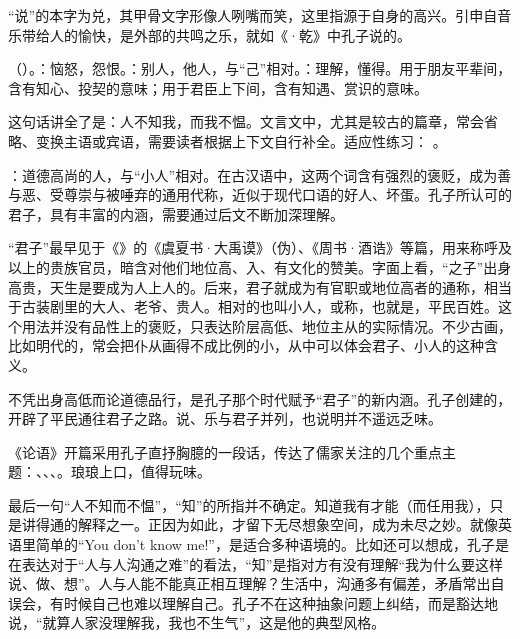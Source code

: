 {“说”的本字为兑，其甲骨文字形像人咧嘴而笑，这里指源于自身的高兴。引申自音乐带给人的愉快，是外部的共鸣之乐，就如《·乾》中孔子说的。

\item {}（）。：恼怒，怨恨。：别人，他人，与“己”相对。：理解，懂得。用于朋友平辈间，含有知心、投契的意味；用于君臣上下间，含有知遇、赏识的意味。

这句话讲全了是：人不知我，而我不愠。文言文中，尤其是较古的篇章，常会省略、变换主语或宾语，需要读者根据上下文自行补全。适应性练习：   。

\item {}：道德高尚的人，与“小人”相对。在古汉语中，这两个词含有强烈的褒贬，成为善与恶、受尊崇与被唾弃的通用代称，近似于现代口语的好人、坏蛋。孔子所认可的君子，具有丰富的内涵，需要通过后文不断加深理解。

“君子”最早见于《》的《虞夏书·大禹谟》（伪）、《周书·酒诰》等篇，用来称呼及以上的贵族官员，暗含对他们地位高、入、有文化的赞美。字面上看，“之子”出身高贵，天生是要成为人上人的。后来，君子就成为有官职或地位高者的通称，相当于古装剧里的大人、老爷、贵人。相对的也叫小人，或称，也就是，平民百姓。这个用法并没有品性上的褒贬，只表达阶层高低、地位主从的实际情况。不少古画，比如明代的，常会把仆从画得不成比例的小，从中可以体会君子、小人的这种含义。

不凭出身高低而论道德品行，是孔子那个时代赋予“君子”的新内涵。孔子创建的，开辟了平民通往君子之路。说、乐与君子并列，也说明并不遥远乏味。
}
{
《论语》开篇采用孔子直抒胸臆的一段话，传达了儒家关注的几个重点主题：、、、。琅琅上口，值得玩味。

最后一句“人不知而不愠”，“知”的所指并不确定。知道我有才能（而任用我），只是讲得通的解释之一。正因为如此，才留下无尽想象空间，成为未尽之妙。就像英语里简单的“You don't know me!”，是适合多种语境的。比如还可以想成，孔子是在表达对于“人与人沟通之难”的看法，“知”是指对方有没有理解“我为什么要这样说、做、想”。人与人能不能真正相互理解？生活中，沟通多有偏差，矛盾常出自误会，有时候自己也难以理解自己。孔子不在这种抽象问题上纠结，而是豁达地说，“就算人家没理解我，我也不生气”，这是他的典型风格。
}

